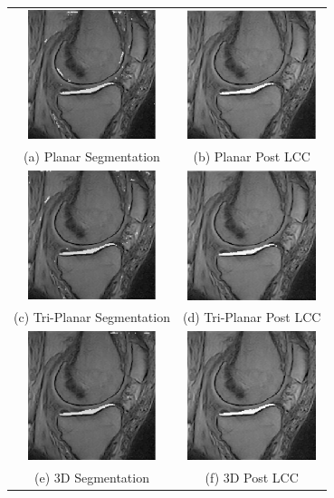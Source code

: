 \documentclass[11pt,a4paper]{memoir}
\numberwithin{figure}{section}
\numberwithin{table}{section}
\numberwithin{equation}{section}
\begin{document}
\begin{figure}
\centering
\begin{tabular}{cc}
\includegraphics[width = 3.75cm]{planpre.jpeg} & \includegraphics[width = 3.75cm]{planpost.jpeg}\\
(a) Planar Segmentation & (b) Planar Post LCC \\
\includegraphics[width = 3.75cm]{tripre.jpeg} & \includegraphics[width = 3.75cm]{tripost.jpeg}\\
(c) Tri-Planar Segmentation & (d) Tri-Planar Post LCC \\
\includegraphics[width = 3.75cm]{3dpre.jpeg} & \includegraphics[width = 3.75cm]{3dpost.jpeg}\\
(e) 3D Segmentation & (f) 3D Post LCC \\



\end{tabular}
\end{figure}
\end{document}

